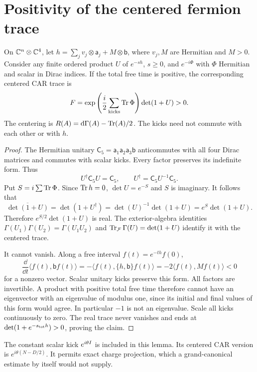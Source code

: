 \section{Positivity of the centered fermion trace}
\begin{lemma}\label{lem:positive-trace}
On $\mathbb C^n\otimes\mathbb C^4$, let
$h=\sum_jv_j\otimes\mathsf a_j+M\otimes\mathsf b$,
where $v_j,M$ are Hermitian and $M>0$.
Consider any finite ordered product $U$ of $e^{-sh}$, $s\ge0$,
and $e^{-i\Phi}$ with $\Phi$ Hermitian and scalar in Dirac indices.
If the total free time is positive, the corresponding centered CAR trace is
\begin{equation}
F=\exp\left(\frac i2\sum_{\rm kicks}\operatorname{Tr}\Phi\right)\det(1+U)>0.
\label{eq:positive-trace}
\end{equation}
The centering is $R(A)=\mathrm d\Gamma(A)-\operatorname{Tr}(A)/2$.
The kicks need not commute with each other or with $h$.
\end{lemma}
\begin{proof}
The Hermitian unitary $\mathsf C_5=\mathsf a_1\mathsf a_2\mathsf a_3
\mathsf b$ anticommutes with all four Dirac matrices and commutes
with scalar kicks. Every factor preserves its indefinite form. Thus
\[
U^\dagger\mathsf C_5U=\mathsf C_5,\qquad
U^\dagger=\mathsf C_5U^{-1}\mathsf C_5.
\]
Put $S=i\sum\operatorname{Tr}\Phi$. Since $\operatorname{Tr} h=0$, $\det U=e^{-S}$ and $S$ is
imaginary. It follows that
\[
\overline{\det(1+U)}=\det(1+U^\dagger)
=\det(U)^{-1}\det(1+U)=e^S\det(1+U).
\]
Therefore $e^{S/2}\det(1+U)$ is real.
The exterior-algebra identities $\Gamma(U_1)\Gamma(U_2)=\Gamma(U_1U_2)$
and $\operatorname{Tr}_{\mathcal F}\Gamma(U)=\det(1+U)$ identify it with the centered trace.

It cannot vanish. Along a free interval $f(t)=e^{-th}f(0)$,
\begin{equation}
\frac{\dd}{\dd t}\langle f(t),\mathsf b f(t)\rangle
=-\langle f(t),\{h,\mathsf b\}f(t)\rangle
=-2\langle f(t),M f(t)\rangle<0
\label{eq:beta-monotone}
\end{equation}
for a nonzero vector. Scalar unitary kicks preserve this form.
All factors are invertible. A product with positive total free time
therefore cannot have an eigenvector with an eigenvalue of modulus one,
since its initial and final values of this form would agree.
In particular $-1$ is not an eigenvalue.
Scale all kicks continuously to zero. The real trace never vanishes
and ends at $\det(1+e^{-s_{\rm tot}h})>0$, proving the claim.
\end{proof}

The constant scalar kick $e^{i\theta I}$ is included in this lemma.
Its centered CAR version is $e^{i\theta(N-D/2)}$.
It permits exact charge projection, which a grand-canonical estimate
by itself would not supply.

